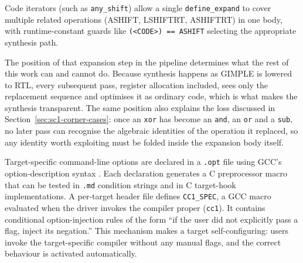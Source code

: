 Code iterators (such as \texttt{any\_shift}) allow a single \texttt{define\_expand} to cover multiple
related operations (ASHIFT, LSHIFTRT, ASHIFTRT) in one body, with runtime-constant guards like
\texttt{(<CODE>) == ASHIFT} selecting the appropriate synthesis path.



The position of that expansion step in the pipeline determines what the rest of this work can and
cannot do. Because synthesis happens as GIMPLE is lowered to RTL, every subsequent pass, register
allocation included, sees only the replacement sequence and optimises it as ordinary code, which is
what makes the synthesis transparent. The same position also explains the loss discussed in
Section~\ref{sec:sc1-corner-cases}: once an \texttt{xor} has become an \texttt{and}, an \texttt{or} and
a \texttt{sub}, no later pass can recognise the algebraic identities of the operation it replaced, so
any identity worth exploiting must be folded inside the expansion body itself.

Target-specific command-line options are declared in a \texttt{.opt} file using GCC's
option-description syntax \cite{gcc-internals}. Each declaration generates a C preprocessor macro
that can be tested in \texttt{.md} condition strings and in C target-hook implementations. A
per-target header file defines \texttt{CC1\_SPEC}, a GCC macro evaluated when the driver invokes the
compiler proper (\texttt{cc1}). It contains conditional option-injection rules of the form ``if the
user did not explicitly pass a flag, inject its negation.'' This mechanism makes a target
self-configuring: users invoke the target-specific compiler without any manual flags, and the correct
behaviour is activated automatically.

